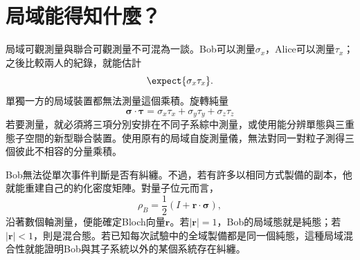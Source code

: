 \begin{classroomqa}
\end{classroomqa}

\begin{classroomqa}
\end{classroomqa}

\section{局域能得知什麼？}

局域可觀測量與聯合可觀測量不可混為一談。Bob可以測量\(\sigma_x\)，Alice可以測量\(\tau_x\)；之後比較兩人的紀錄，就能估計
\begin{equation}
\expect{\sigma_x\tau_x}.
\end{equation}
單獨一方的局域裝置都無法測量這個乘積。旋轉純量
\begin{equation}
\boldsymbol{\sigma}\cdot\boldsymbol{\tau}
=\sigma_x\tau_x+\sigma_y\tau_y+\sigma_z\tau_z
\end{equation}
若要測量，就必須將三項分別安排在不同子系綜中測量，或使用能分辨單態與三重態子空間的新型聯合裝置。使用原有的局域自旋測量儀，無法對同一對粒子測得三個彼此不相容的分量乘積。

\begin{classroomqa}
\end{classroomqa}

Bob無法從單次事件判斷是否有糾纏。不過，若有許多以相同方式製備的副本，他就能重建自己的約化密度矩陣。對量子位元而言，
\begin{equation}
\rho_B
=\frac12\left(
I+\mathbf r\cdot\boldsymbol{\sigma}
\right),
\label{eq:l7-bloch-density}
\end{equation}
沿著數個軸測量，便能確定Bloch向量\(\mathbf r\)。若\(|\mathbf r|=1\)，Bob的局域態就是純態；若\(|\mathbf r|<1\)，則是混合態。若已知每次試驗中的全域製備都是同一個純態，這種局域混合性就能證明Bob與其子系統以外的某個系統存在糾纏。

